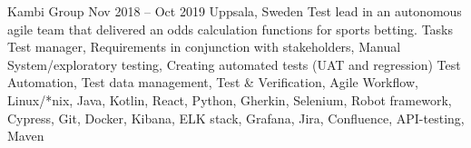 \documentclass{sobCV}[2015/09/08]
\begin{document}
   

   {Kambi Group}
   {Nov 2018 -- Oct 2019}
   {Uppsala, Sweden}{
       Test lead in an autonomous agile team that delivered an odds calculation
       functions for sports betting.
   }
    {Tasks}{
       Test manager,
       Requirements in conjunction with stakeholders,
       Manual System/exploratory testing,
       Creating automated tests (UAT and regression)
 }{  %
 }{
       Test Automation,
       Test data management,
       Test \& Verification,
       Agile Workflow, 
       Linux/*nix, 
       Java, 
       Kotlin, 
       React, 
       Python, 
       Gherkin, 
       Selenium, 
       Robot framework,
       Cypress, 
       Git, 
       Docker, 
       Kibana, 
       ELK stack, 
       Grafana, 
       Jira, 
       Confluence, 
       API-testing, 
       Maven 
}
\end{document}
